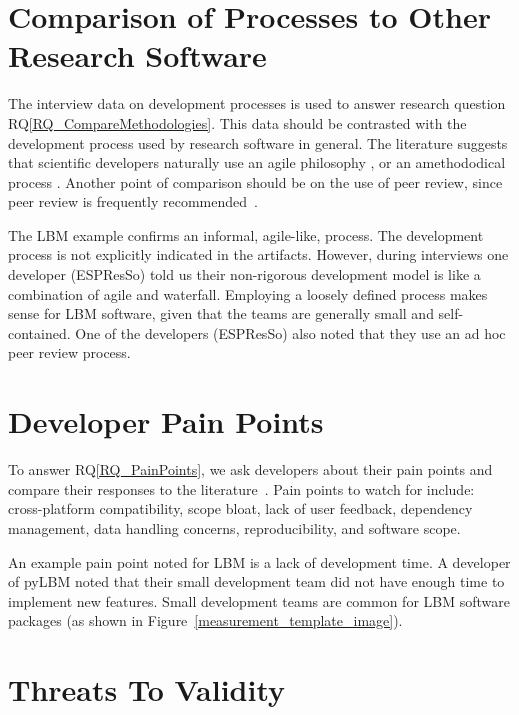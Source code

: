 \documentclass[runningheads]{llncs}
\newcommand{\rqref}[1]{RQ\ref{#1}}
\begin{document}
\section{Comparison of Processes to Other Research Software} \label{Sec_CompareMethodologies}

The interview data on development processes is used to answer research question
\rqref{RQ_CompareMethodologies}.  This data should be contrasted with the
development process used by research software in general. The literature
suggests that scientific developers naturally use an agile philosophy
\cite{CarverEtAl2007,Segal2005}, or an amethododical process \cite{Kelly2013}.
Another point of comparison should be on the use of peer review, since peer
review is frequently recommended~\cite{HerouxEtAl2008,OrvizEtAl2017,USGS2019}.

The LBM example confirms an informal, agile-like, process. The development
process is not explicitly indicated in the artifacts. However, during interviews
one developer (ESPResSo) told us their non-rigorous development model is like a
combination of agile and waterfall. Employing a loosely defined process makes
sense for LBM software, given that the teams are generally small and
self-contained. One of the developers (ESPResSo) also noted that they use an ad
hoc peer review process.

\section{Developer Pain Points} \label{painpoints}

To answer \rqref{RQ_PainPoints}, we ask developers about their pain points and
compare their responses to the literature~\cite{WieseEtAl2019,PintoEtAl2018}.
Pain points to watch for include: cross-platform compatibility, scope bloat,
lack of user feedback, dependency management, data handling concerns,
reproducibility, and software scope. 

An example pain point noted for LBM is a lack of development time. A developer
of pyLBM noted that their small development team did not have enough time to
implement new features. Small development teams are common for LBM software
packages (as shown in Figure~\ref{measurement_template_image}).

\section{Threats To Validity} \label{threats}
\end{document}
